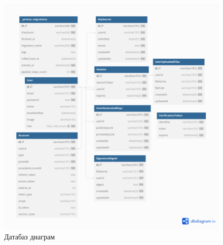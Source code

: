 \begin{figure}[h!]
	\centering
	\includegraphics[scale=0.46]{assets/cryptography.png}
	\caption{Датабаз диаграм}
	\label{fig:dbdiagram}
\end{figure}
\break
\newpage
